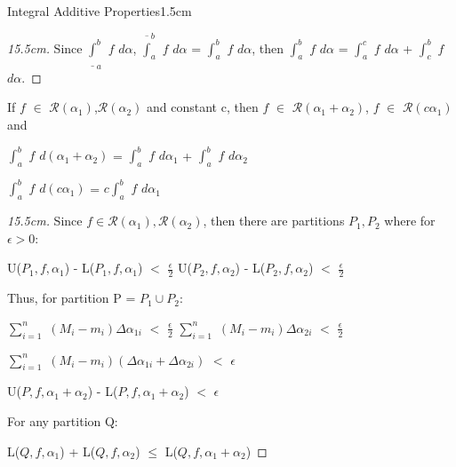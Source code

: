 \begin{ltheorem}{Integral Additive Properties}{1.5cm}
\begin{proof}[15.5cm]
            Since $\underline{\int}_a^b$ $f$ $d\alpha$,
            $\overline{\int}_a^b$ $f$ $d\alpha$
            = $\int_a^b$ $f$ $d\alpha$, then
            $\int_a^b$ $f$ $d\alpha$
            = $\int_a^c$ $f$ $d\alpha$ + $\int_c^b$ $f$ $d\alpha$.
        \end{proof}

    \item If $f$ $\in$ $\mathscr{R}(\alpha_1)$,$\mathscr{R}(\alpha_2)$ and
    constant c, then $f$ $\in$ $\mathscr{R}(\alpha_1+\alpha_2)$,
    $f$ $\in$ $\mathscr{R}(c\alpha_1)$ and

        \hspace{0.5cm}
        $\int_a^b$ $f$ $d(\alpha_1 + \alpha_2)$
        = $\int_a^b$ $f$ $d\alpha_1$ + $\int_a^b$ $f$ $d\alpha_2$

        \hspace{0.5cm}
        $\int_a^b$ $f$ $d(c\alpha_1)$
        = $c \int_a^b$ $f$ $d\alpha_1$

        \begin{proof}[15.5cm]
            Since $f \in \mathscr{R}(\alpha_1),\mathscr{R}(\alpha_2)$,
            then there are partitions $P_1,P_2$ where for $\epsilon > 0$:

            \hspace{0.5cm}
            U($P_1,f,\alpha_1$) - L($P_1,f,\alpha_1$) $<$ $\frac{\epsilon}{2}$
            \hspace{1cm}
            U($P_2,f,\alpha_2$) - L($P_2,f,\alpha_2$) $<$ $\frac{\epsilon}{2}$

            Thus, for partition P = $P_1 \cup P_2$:

            \hspace{0.5cm}
            $\sum_{i=1}^n$ $(M_i - m_i) \Delta \alpha_{1i}$
            $<$ $\frac{\epsilon}{2}$
            \hspace{1.5cm}
            $\sum_{i=1}^n$ $(M_i - m_i) \Delta \alpha_{2i}$
            $<$ $\frac{\epsilon}{2}$

            \hspace{2cm}
            $\sum_{i=1}^n$ $(M_i - m_i)
                            (\Delta \alpha_{1i} + \Delta \alpha_{2i})$
            $<$ $\epsilon$

            \hspace{2cm}
            U($P,f,\alpha_1+\alpha_2$) - L($P,f,\alpha_1+\alpha_2$)
            $<$ $\epsilon$

            For any partition Q:

            \hspace{0.5cm}
            L($Q,f,\alpha_1$) + L($Q,f,\alpha_2$)
            $\leq$ L($Q,f,\alpha_1+\alpha_2$)
            

\end{proof}
\end{ltheorem}
